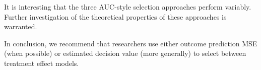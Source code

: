 It is interesting that the three AUC-style selection approaches perform variably. Further investigation of the theoretical properties of these approaches is warranted.

In conclusion, we recommend that researchers use either outcome prediction MSE (when possible) or estimated decision value (more generally) to select between treatment effect models. 


